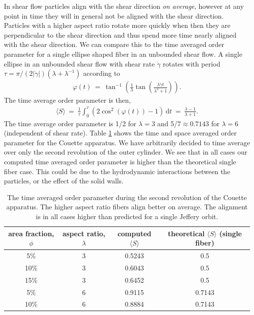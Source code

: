 \documentclass[preprint, 10pt]{elsarticle}
\begin{document}
In shear flow particles align with the shear direction
\emph{on average}, however at any point in time they will in general not
be aligned with the shear direction. Particles with a higher aspect
ratio rotate more quickly when then they are perpendicular to the shear
direction and thus spend more time nearly aligned with the shear
direction. We can compare this to the time averaged order parameter for
a single ellipse shaped fiber in an unbounded shear flow. A single
ellipse in an unbounded shear flow with shear rate $\dot{\gamma}$ rotates with
period $\tau = \pi/(2| \dot{\gamma}|)(\lambda + \lambda^{-1})$ \cite{Jeffery1922}
according to 
\begin{align*}
  \varphi(t) ~=~ \tan^{-1}\left(\frac{1}{\lambda}\tan\left(
    \frac{\lambda \dot{\gamma}t}{\lambda^2 + 1}\right)\right).
\end{align*}
The time average order parameter is then,
\begin{align*}
  \langle S\rangle ~=~ \frac{1}{\tau}\int_0^\tau\left( 
    2\cos^2(\varphi(t)) - 1\right)~\text{d}t ~=~ \frac{\lambda -1}{\lambda+1}.
\end{align*}
The time average order parameter is 1/2 for $\lambda= 3$ and 5/7$\approx 0.7143$ for $\lambda=6$
(independent of shear rate). Table \ref{tab:order} shows the time and space averaged order parameter
for the Couette apparatus. We have arbitrarily decided to time average over only the second
revolution of the outer cylinder. We see that in all cases our computed time averaged order
parameter is higher than the theoretical single fiber case. This could be due to the hydrodynamic
interactions between the particles, or the effect of the solid walls.

\begin{table}[!h]
\begin{center}
\begin{tabular}{c |c |c |c}
area fraction, $\phi$ & aspect ratio, $\lambda$ & computed $ \langle S \rangle$ & theoretical
$\langle S \rangle$ (single fiber)\\
\hline
5\% &3& 0.5243 & 0.5\\
10\% &3 & 0.6043 & 0.5\\
15\% & 3 & 0.6452 & 0.5\\
5\% & 6 & 0.9115 & 0.7143\\
10\% & 6 & 0.8884 & 0.7143
\end{tabular}
\end{center}
\caption{The time averaged order parameter during the second revolution of the Couette apparatus. The higher aspect ratio fibers align better on average. The alignment is in all cases higher than predicted for a single Jeffery orbit.
}\label{tab:order}
\end{table} 
\end{document}
